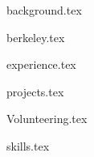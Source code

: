 \documentclass[11pt]{article}
\begin{document}
{background.tex}

{berkeley.tex}

{experience.tex}

{projects.tex}

{Volunteering.tex}

{skills.tex}
\end{document}
